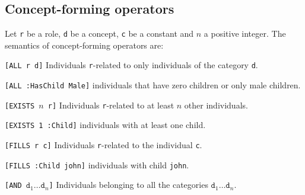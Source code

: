 \subsection{Concept-forming operators}
Let \texttt{r} be a role, \texttt{d} be a concept, \texttt{c} be a constant and $n$ a positive integer.
The semantics of concept-forming operators are:
\begin{descriptionlist}
    \item[\texttt{[ALL r d]}] 
        Individuals \texttt{r}-related to only individuals of the category \texttt{d}.
        \begin{example}
            \texttt{[ALL :HasChild Male]} individuals that have zero children or only male children.
        \end{example}
    
    \item[\texttt{[EXISTS $n$ r]}] 
        Individuals \texttt{r}-related to at least $n$ other individuals.
        \begin{example}
            \texttt{[EXISTS 1 :Child]} individuals with at least one child.
        \end{example}

    \item[\texttt{[FILLS r c]}] 
        Individuals \texttt{r}-related to the individual \texttt{c}.
        \begin{example}
            \texttt{[FILLS :Child john]} individuals with child \texttt{john}.
        \end{example}

    \item[\texttt{[AND $\texttt{d}_1 \dots \texttt{d}_n$]}] 
        Individuals belonging to all the categories $\texttt{d}_1 \dots \texttt{d}_n$.
\end{descriptionlist}


